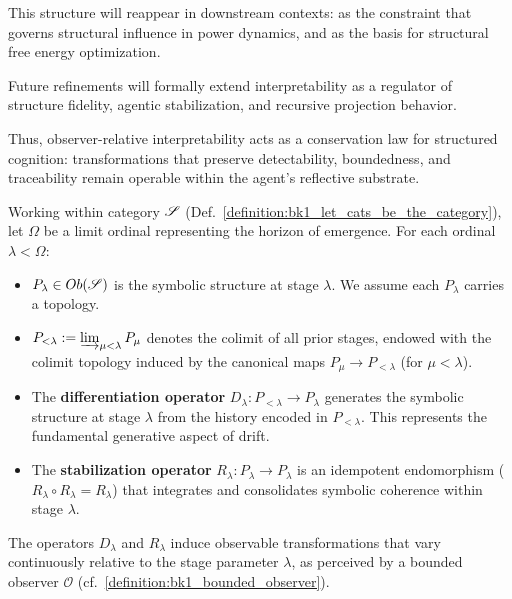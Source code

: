 This structure will reappear in downstream contexts:  
as the constraint that governs structural influence in power dynamics,  
and as the basis for structural free energy optimization.

Future refinements will formally extend interpretability  
as a regulator of structure fidelity, agentic stabilization, and recursive projection behavior.  

Thus, observer-relative interpretability acts as a conservation law  
for structured cognition: transformations that preserve detectability,  
boundedness, and traceability remain operable within the agent’s reflective substrate.

\begin{definition}
\label{definition:bk1_pre_geometric_operators_and_stages}
Working within category $\mathscr{S}$
(Def.~\ref{definition:bk1_let_cats_be_the_category}), let $\Omega$ be a limit
ordinal representing the horizon of emergence.
For each ordinal $\lambda < \Omega$:
\begin{itemize}
    \item $P_\lambda \in Ob(\mathscr{S})$ is the symbolic structure at stage $\lambda$. We assume each $P_\lambda$ carries a topology.
    \item $P_{<\lambda} := \varinjlim_{\mu < \lambda} P_\mu$ denotes the colimit of all prior stages, endowed with the colimit topology induced by the canonical maps $P_\mu \to P_{<\lambda}$ (for $\mu < \lambda$).
    \item The \textbf{differentiation operator} $D_\lambda: P_{<\lambda} \to P_\lambda$ generates the symbolic structure at stage $\lambda$ from the history encoded in $P_{<\lambda}$. This represents the fundamental generative aspect of drift.
    \item The \textbf{stabilization operator} $R_\lambda: P_\lambda \to P_\lambda$ is an idempotent endomorphism ($R_\lambda \circ R_\lambda = R_\lambda$) that integrates and consolidates symbolic coherence within stage $\lambda$.
\end{itemize}
\end{definition}
\begin{axiom}
\label{axiom:bk1_observable_gradation_of_pre_geometric_operations}
The operators $D_\lambda$ and $R_\lambda$ induce observable transformations that vary continuously relative to the stage parameter $\lambda$, as perceived by a bounded observer $\mathcal{O}$ (cf.~\ref{definition:bk1_bounded_observer}).
\end{axiom}

